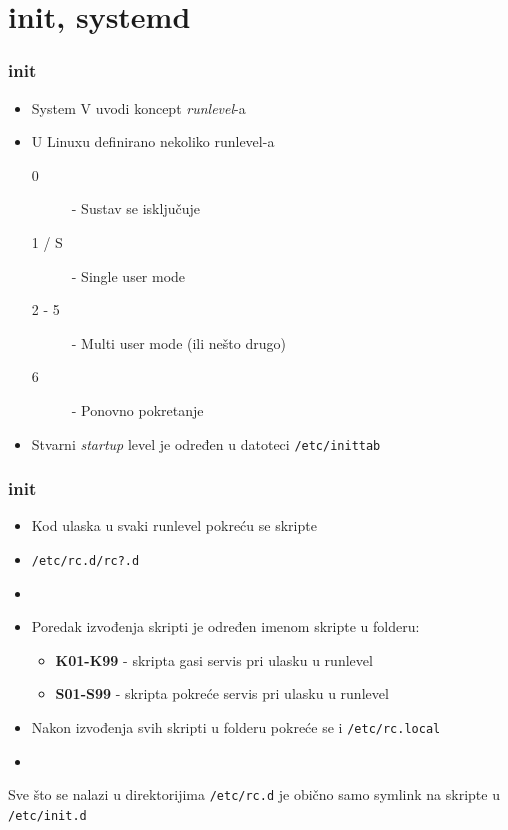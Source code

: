 \documentclass[t]{beamer}
\begin{document}
\section{init, systemd}
\begin{frame}
	\frametitle{init}
	\begin{itemize}
		\item System V uvodi koncept \emph{runlevel}-a
	\end{itemize}
	\begin{itemize}
		\item U Linuxu definirano nekoliko runlevel-a
		\begin{description}
			\item[0] - Sustav se isključuje
			\item[1 / S] - Single user mode
			\item[2 - 5] - Multi user mode (ili nešto drugo)
			\item[6] - Ponovno pokretanje
		\end{description}
		\item Stvarni \textit{startup} level je određen u datoteci \texttt{/etc/inittab}
	\end{itemize}
\end{frame}

\begin{frame}
	\frametitle{init}
	\begin{itemize}
		\item Kod ulaska u svaki runlevel pokreću se skripte
		\item[] \texttt{/etc/rc.d/rc?.d}
		\item[]
		\item Poredak izvođenja skripti je određen imenom skripte u folderu:
		\begin{itemize}
			\item[] \textbf{K01-K99} - skripta gasi servis pri ulasku u runlevel
			\item[] \textbf{S01-S99} - skripta pokreće servis pri ulasku u runlevel
		\end{itemize}
		\item Nakon izvođenja svih skripti u folderu pokreće se i \texttt{/etc/rc.local}
		\item[]
	\end{itemize}
	Sve što se nalazi u direktorijima \texttt{/etc/rc.d} je obično samo symlink na skripte u \texttt{/etc/init.d}
\end{frame}
\end{document}
